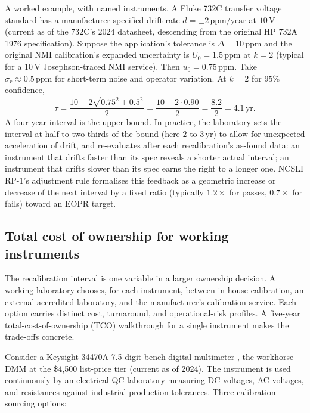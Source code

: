 A worked example, with named instruments. A Fluke 732C transfer
voltage standard has a manufacturer-specified drift rate $d =
\pm 2 \,\text{ppm}/\text{year}$ at $10\,\si{\volt}$ (current as of
the 732C's 2024 datasheet, descending from the original HP 732A
1976 specification). Suppose the application's tolerance is
$\Delta = 10 \,\text{ppm}$ and the original NMI calibration's
expanded uncertainty is $U_{0} = 1.5 \,\text{ppm}$ at $k = 2$
(typical for a 10\,V Josephson-traced NMI service). Then $u_{0} =
0.75 \,\text{ppm}$. Take $\sigma_{r} \approx 0.5 \,\text{ppm}$ for
short-term noise and operator variation. At $k = 2$ for $95\%$
confidence,
\[
\tau = \frac{10 - 2\sqrt{0.75^{2} + 0.5^{2}}}{2}
     = \frac{10 - 2 \cdot 0.90}{2}
     = \frac{8.2}{2}
     = 4.1 \,\text{yr}.
\]
A four-year interval is the upper bound. In practice, the laboratory
sets the interval at half to two-thirds of the bound (here $2$ to
$3 \,\text{yr}$) to allow for unexpected acceleration of drift, and
re-evaluates after each recalibration's as-found data: an instrument
that drifts faster than its spec reveals a shorter actual interval;
an instrument that drifts slower than its spec earns the right to a
longer one. NCSLI RP-1's adjustment rule
\cite{web:ch03t3-ncsli-rp-1-2010} formalises this feedback as a
geometric increase or decrease of the next interval by a fixed
ratio (typically $1.2\times$ for passes, $0.7\times$ for fails)
toward an EOPR target.

\subsection{Total cost of ownership for working instruments}

The recalibration interval is one variable in a larger ownership
decision. A working laboratory chooses, for each instrument,
between in-house calibration, an external accredited laboratory,
and the manufacturer's calibration service. Each option carries
distinct cost, turnaround, and operational-risk profiles. A
five-year total-cost-of-ownership (TCO) walkthrough for a single
instrument makes the trade-offs concrete.

Consider a Keysight 34470A 7.5-digit bench digital multimeter
\cite{web:ch03t3-keysight-34470a}, the workhorse DMM at the
\$4{,}500 list-price tier (current as of 2024). The instrument is
used continuously by an electrical-QC laboratory measuring DC
voltages, AC voltages, and resistances against industrial
production tolerances. Three calibration sourcing options:

